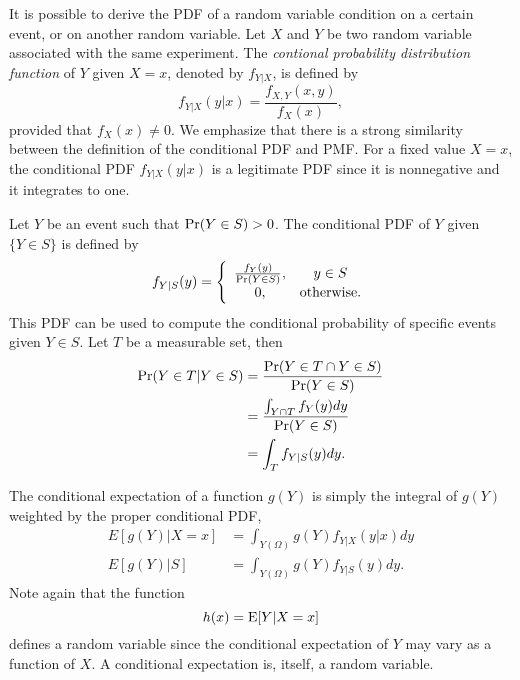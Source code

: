 It is possible to derive the PDF of a random variable condition on a certain event, or on another random variable.
Let $X$ and $Y$ be two random variable associated with the same experiment.
The \emph{contional probability distribution function} of $Y$ given $X = x$, denoted by $f_{Y|X}$, is defined by
\begin{equation} \label{equation:ContinuousConditonalPDF}
f_{Y|X} (y|x) = \frac{f_{X,Y} (x,y)}{f_X(x)},
\end{equation}
provided that $f_X(x) \neq 0$.
We emphasize that there is a strong similarity between the definition of the conditional PDF and PMF.
For a fixed value $X = x$, the conditional PDF $f_{Y|X} (y|x)$ is a legitimate PDF since it is nonnegative and it integrates to one.

\begin{example}
\end{example}

Let $Y$ be an event such that $\Pr (Y \in S) > 0$.
The conditional PDF of $Y$ given $\{ Y \in S \}$ is defined by
\begin{equation*}
f_{Y|S} (y)
= \left\{ \begin{array}{cc} \frac{ f_Y(y) }{\Pr (Y \in S)}, & y \in S \\
0, & \text{otherwise}. \end{array} \right.
\end{equation*}
This PDF can be used to compute the conditional probability of specific events given $Y \in S$.
Let $T$ be a measurable set, then
\begin{equation*}
\begin{split}
\Pr ( Y \in T | Y \in S)
&= \frac{ \Pr ( Y \in T \cap Y \in S) }{ \Pr ( Y \in S) } \\
&= \frac{ \int_{Y \cap T} f_Y(y) dy }{ \Pr ( Y \in S) } \\
&= \int_{T} f_{Y|S} (y) dy .
\end{split}
\end{equation*}

\begin{example}
\end{example}

The conditional expectation of a function $g(Y)$ is simply the integral of $g(Y)$ weighted by the proper conditional PDF,
\begin{align*}
E[g(Y) | X = x] &= \int_{Y(\Omega)} g(Y) f_{Y|X} (y|x) dy \\
E[g(Y) | S] &= \int_{Y(\Omega)} g(Y) f_{Y|S} (y) dy .
\end{align*}
Note again that the function
\begin{equation*}
h(x) = \mathrm{E} [Y | X=x]
\end{equation*}
defines a random variable since the conditional expectation of $Y$ may vary as a function of $X$.
A conditional expectation is, itself, a random variable.

